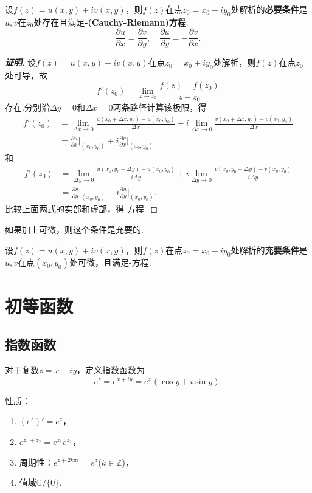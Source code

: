 \documentclass[openany,oneside]{ctexbook}
\begin{document}
\begin{theorem}
    设$f(z)=u(x,y)+iv(x,y)$，则$f(z)$在点$z_0=x_0+iy_0$处解析的\textbf{必要条件}是$u,v$在$z_0$处存在且满足\textbf{-(Cauchy-Riemann)方程}:
\[\frac{\partial u}{\partial x} = \frac{\partial v}{\partial y},\quad \frac{\partial u}{\partial y} = -\frac{\partial v}{\partial x}.
\]
\end{theorem}
\begin{proof}[\textbf{证明}]
设$f(z)=u(x,y)+iv(x,y)$在点$z_0=x_0+iy_0$处解析，则$f(z)$在点$z_0$处可导，故
\[f'(z_0) = \lim_{z \to z_0} \frac{f(z) - f(z_0)}{z - z_0}
\]
存在.分别沿$\Delta y=0$和$\Delta x=0$两条路径计算该极限，得
\[\begin{aligned}
    f'(z_0) & = \lim_{\Delta x \to 0} \frac{u(x_0 + \Delta x, y_0) - u(x_0, y_0)}{\Delta x} + i\lim_{\Delta x \to 0} \frac{v(x_0 + \Delta x, y_0) - v(x_0, y_0)}{\Delta x} \\
    & = \frac{\partial u}{\partial x}\bigg|_{(x_0,y_0)} + i\frac{\partial v}{\partial x}\bigg|_{(x_0,y_0)}
\end{aligned}
\]
和
\[\begin{aligned}
    f'(z_0) & = \lim_{\Delta y \to 0} \frac{u(x_0, y_0 + \Delta y) - u(x_0, y_0)}{i\Delta y} + i\lim_{\Delta y \to 0} \frac{v(x_0, y_0 + \Delta y) - v(x_0, y_0)}{i\Delta y} \\
    & = \frac{\partial v}{\partial y}\bigg|_{(x_0,y_0)}
-i\frac{\partial u}{\partial y}\bigg|_{(x_0,y_0)}.
\end{aligned}\]
比较上面两式的实部和虚部，得-方程.
\end{proof}
如果加上可微，则这个条件是充要的.
\begin{theorem}
    设$f(z)=u(x,y)+iv(x,y)$，则$f(z)$在点$z_0=x_0+iy_0$处解析的\textbf{充要条件}是$u,v$在点$(x_0,y_0)$处可微，且满足-方程.
\end{theorem}


\section{初等函数}
\subsection{指数函数}
\begin{definition}
    对于复数$z = x + iy$，定义指数函数为
\[e^z = e^{x + iy} = e^x(\cos y + i\sin y).\]
\end{definition}
性质：
\begin{enumerate}\setlength{\itemsep}{0.5pt}
  \item $(e^z)' = e^z$，
  \item $e^{z_1 + z_2} = e^{z_1}e^{z_2}$，
  \item 周期性：$e^{z + 2k\pi i} = e^z$($k \in \mathbb{Z}$)，
  \item 值域$\mathbb{C}/\{0\}$.
\end{enumerate}
\end{document}
